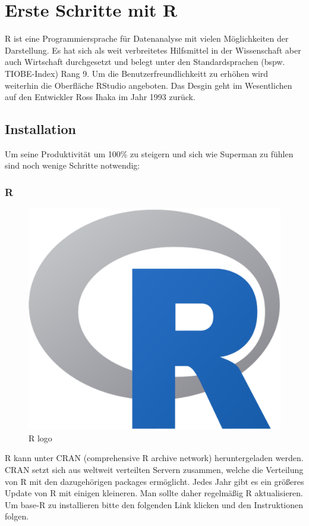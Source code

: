 \documentclass[
]{article}
\begin{document}
\hypertarget{erste-schritte-mit-r}{%
\section{Erste Schritte mit R}\label{erste-schritte-mit-r}}

R ist eine Programmiersprache für Datenanalyse mit vielen Möglichkeiten der Darstellung. Es hat sich als weit verbreitetes Hilfsmittel in der Wissenschaft aber auch Wirtschaft durchgesetzt und belegt unter den Standardsprachen (bspw. TIOBE-Index) Rang 9. Um die Benutzerfreundlichkeitt zu erhöhen wird weiterhin die Oberfläche RStudio angeboten. Das Desgin geht im Wesentlichen auf den Entwickler Ross Ihaka im Jahr 1993 zurück.

\hypertarget{installation}{%
\subsection{Installation}\label{installation}}

Um seine Produktivität um 100\% zu steigern und sich wie Superman zu fühlen sind noch wenige Schritte notwendig:

\hypertarget{r}{%
\subsubsection{R}\label{r}}

\begin{figure}

{\centering \includegraphics[width=0.5\linewidth]{images/004} 

}

\caption{R logo}\label{fig:unnamed-chunk-7}
\end{figure}

R kann unter CRAN (comprehensive R archive network) heruntergeladen werden. CRAN setzt sich aus weltweit verteilten Servern zusammen, welche die Verteilung von R mit den dazugehörigen packages ermöglicht. Jedes Jahr gibt es ein größeres Update von R mit einigen kleineren. Man sollte daher regelmäßig R aktualisieren. Um base-R zu installieren bitte den folgenden Link klicken und den Instruktionen folgen.
\end{document}
